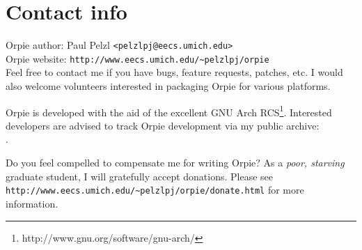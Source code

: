 \documentclass[11pt,notitlepage]{article}
\begin{document}
\section{Contact info}
Orpie author: Paul Pelzl {\tt <pelzlpj@eecs.umich.edu>} \\
Orpie website: {\tt http://www.eecs.umich.edu/\~{}pelzlpj/orpie} \\


\noindent
Feel free to contact me if you have bugs, feature requests, patches, etc.  I 
would also welcome volunteers interested in packaging Orpie for various platforms.

Orpie is developed with the aid of the excellent GNU Arch
RCS\footnote{http://www.gnu.org/software/gnu-arch/}.  Interested 
developers are advised to track Orpie development via my public archive: \\
 .  

Do you feel compelled to compensate me for writing Orpie?  As a {\em poor, 
starving} graduate student, I will gratefully accept donations.  Please see \\
{\tt http://www.eecs.umich.edu/\~{}pelzlpj/orpie/donate.html} for more information.
\end{document}
